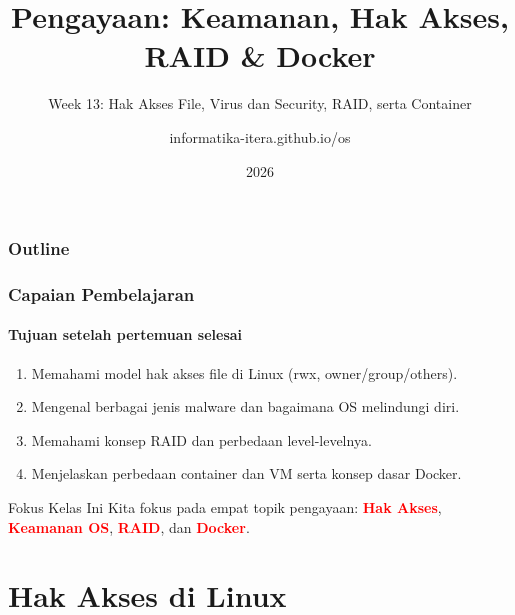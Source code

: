 \documentclass[t,aspectratio=169,xcolor=dvipsnames]{beamer}
\title[Pengayaan OS]{Pengayaan: Keamanan, Hak Akses, RAID \& Docker}
\subtitle{Week 13: Hak Akses File, Virus dan Security, RAID, serta Container}
\author[informatika-itera.github.io/os]{informatika-itera.github.io/os}
\institute[ITERA]{Program Studi Teknik Informatika \\ Institut Teknologi Sumatera}
\date{\textcolor{nyublue}{2026}}
\newcommand{\tem}[1]{\textbf{\textcolor{red}{#1}}}
\begin{document}
\begin{frame}
    \titlepage
\end{frame}

\begin{frame}
    \frametitle{Outline}
    \tableofcontents
\end{frame}

\begin{frame}[shrink=5]
    \frametitle{Capaian Pembelajaran}
    \framesubtitle{Tujuan setelah pertemuan selesai}
    \small
    \begin{enumerate}
        \item Memahami model hak akses file di Linux (rwx, owner/group/others).
        \item Mengenal berbagai jenis malware dan bagaimana OS melindungi diri.
        \item Memahami konsep RAID dan perbedaan level-levelnya.
        \item Menjelaskan perbedaan container dan VM serta konsep dasar Docker.
    \end{enumerate}
    \vspace{0.5cm}
    \begin{exampleblock}{Fokus Kelas Ini}
        Kita fokus pada empat topik pengayaan: \tem{Hak Akses}, \tem{Keamanan OS}, \tem{RAID}, dan \tem{Docker}.
    \end{exampleblock}
\end{frame}

\section{Hak Akses di Linux}
\end{document}
